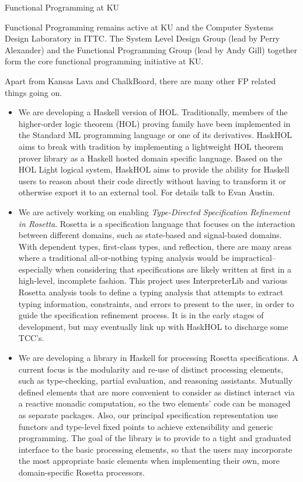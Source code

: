 \documentclass{scrreprt}
\begin{document}
\begin{hcarentry}{Functional Programming at KU}
\makeheader

Functional Programming remains active at KU and 
the Computer Systems Design Laboratory in ITTC.
The System Level Design Group (lead by Perry Alexander)
and the Functional Programming Group (lead by Andy Gill)
together form the core functional programming initiative at KU.

Apart from Kansas Lava and ChalkBoard, there are many other
FP related things going on.

\begin{itemize}
\item We are developing a Haskell version of HOL.
Traditionally, members of the higher-order logic theorem (HOL) proving family have
been implemented in the Standard ML programming language or one of its derivatives.
HaskHOL aims to break with tradition by implementing a lightweight HOL theorem prover
library as a Haskell hosted domain specific language. Based on the HOL Light logical
system, HaskHOL aims to provide the ability for Haskell users to reason about their
code directly without having to transform it or otherwise export it to an external
tool. For details talk to Evan Austin.

\item We are actively working on enabling {\em Type-Directed Specification Refinement in Rosetta\/}. Rosetta is a specification language that focuses on the interaction between different domains, such as state-based and signal-based domains.  With dependent types, first-class types, and reflection, there are many areas where a traditional all-or-nothing typing analysis would be impractical--especially when considering that specifications are likely written at first in a high-level, incomplete fashion.  This project uses InterpreterLib  and various Rosetta analysis tools to define a typing analysis that attempts to extract typing information, constraints, and errors to present to the user, in order to guide the specification refinement process.  It is in the early stages of development, but may eventually link up with HaskHOL to discharge some TCC's.

\item We are developing a library in Haskell for processing Rosetta specifications.
A current focus is the modularity and re-use of distinct processing
elements, such as type-checking, partial evaluation, and reasoning
assistants. Mutually defined elements that are more convenient to
consider as distinct interact via a reactive monadic computation, so
the two elements' code can be managed as separate packages. Also, our
principal specification representation use functors and type-level
fixed points to achieve extensibility and generic programming. The
goal of the library is to provide to a tight and graduated interface
to the basic processing elements, so that the users may incorporate
the most appropriate basic elements when implementing their own, more
domain-specific Rosetta processors.


\end{itemize}
\end{hcarentry}
\end{document}
